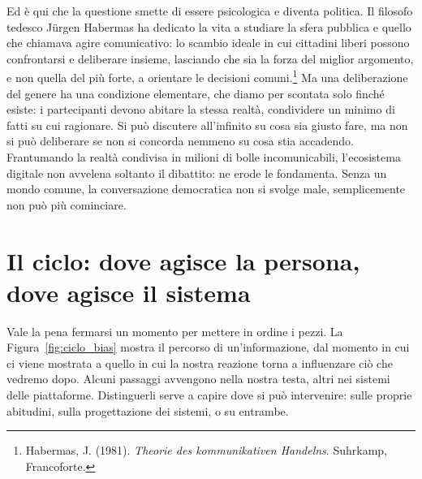 Ed è qui che la questione smette di essere psicologica e diventa politica. Il filosofo tedesco Jürgen Habermas ha dedicato la vita a studiare la sfera pubblica e quello che chiamava agire comunicativo: lo scambio ideale in cui cittadini liberi possono confrontarsi e deliberare insieme, lasciando che sia la forza del miglior argomento, e non quella del più forte, a orientare le decisioni comuni.\footnote{Habermas, J. (1981). \textit{Theorie des kommunikativen Handelns}. Suhrkamp, Francoforte.} Ma una deliberazione del genere ha una condizione elementare, che diamo per scontata solo finché esiste: i partecipanti devono abitare la stessa realtà, condividere un minimo di fatti su cui ragionare. Si può discutere all'infinito su cosa sia giusto fare, ma non si può deliberare se non si concorda nemmeno su cosa stia accadendo. Frantumando la realtà condivisa in milioni di bolle incomunicabili, l'ecosistema digitale non avvelena soltanto il dibattito: ne erode le fondamenta. Senza un mondo comune, la conversazione democratica non si svolge male, semplicemente non può più cominciare.

\section{Il ciclo: dove agisce la persona, dove agisce il sistema}
\label{sec:p2c11-ciclo}

Vale la pena fermarsi un momento per mettere in ordine i pezzi. La Figura~\ref{fig:ciclo_bias} mostra il percorso di un'informazione, dal momento in cui ci viene mostrata a quello in cui la nostra reazione torna a influenzare ciò che vedremo dopo. Alcuni passaggi avvengono nella nostra testa, altri nei sistemi delle piattaforme. Distinguerli serve a capire dove si può intervenire: sulle proprie abitudini, sulla progettazione dei sistemi, o su entrambe.

